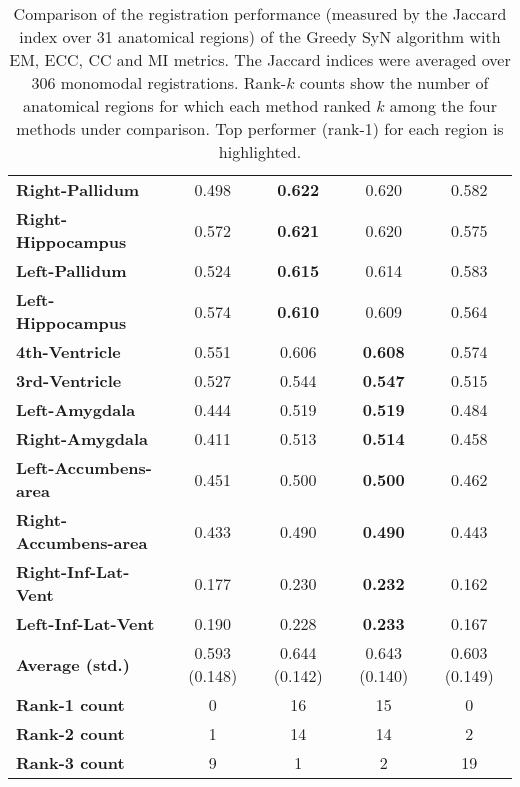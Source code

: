 \begin{table}[htbp]
{\begin{tabular}{lcccc}
    \textbf{Right-Pallidum} & 0.498 & \textbf{0.622} & 0.620 & 0.582 \\
    \textbf{Right-Hippocampus} & 0.572 & \textbf{0.621} & 0.620 & 0.575 \\
    \textbf{Left-Pallidum} & 0.524 & \textbf{0.615} & 0.614 & 0.583 \\
    \textbf{Left-Hippocampus} & 0.574 & \textbf{0.610} & 0.609 & 0.564 \\
    \textbf{4th-Ventricle} & 0.551 & 0.606 & \textbf{0.608} & 0.574 \\
    \textbf{3rd-Ventricle} & 0.527 & 0.544 & \textbf{0.547} & 0.515 \\
    \textbf{Left-Amygdala} & 0.444 & 0.519 & \textbf{0.519} & 0.484 \\
    \textbf{Right-Amygdala} & 0.411 & 0.513 & \textbf{0.514} & 0.458 \\
    \textbf{Left-Accumbens-area} & 0.451 & 0.500 & \textbf{0.500} & 0.462 \\
    \textbf{Right-Accumbens-area} & 0.433 & 0.490 & \textbf{0.490} & 0.443 \\
    \textbf{Right-Inf-Lat-Vent} & 0.177 & 0.230 & \textbf{0.232} & 0.162 \\
    \textbf{Left-Inf-Lat-Vent} & 0.190 & 0.228 & \textbf{0.233} & 0.167 \\
    \hline
    \textbf{Average (std.)} & 0.593 (0.148) & 0.644 (0.142) & 0.643 (0.140) & 0.603 (0.149) \\
    \textbf{Rank-1 count} & 0 & 16 & 15 & 0 \\
    \textbf{Rank-2 count} & 1 & 14 & 14 & 2 \\
    \textbf{Rank-3 count} & 9 & 1 & 2 & 19 \\
    \bottomrule
    \end{tabular}}%
    \caption{Comparison of the registration performance (measured by the Jaccard index over 31 anatomical regions) of the Greedy SyN algorithm with EM, ECC, CC and MI metrics.
The Jaccard indices were averaged over 306 monomodal registrations. Rank-$k$ counts show the number of anatomical regions for which each
method ranked $k$ among the four methods under comparison. Top performer (rank-1) for each region is highlighted. }
  \label{tab:monomodal_results_seg}%
\end{table}%
